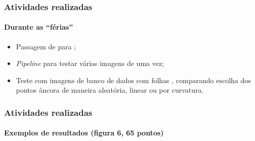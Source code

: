 \begin{frame}
	\frametitle{Atividades realizadas}
	\framesubtitle{Durante as ``férias''}
	
	\begin{itemize}
		\item Passagem de  para ;
		\item \textit{Pipeline} para testar várias imagens de uma vez;
		\item Teste com imagens de banco de dados com folhas \cite{imageclef2011}, comparando escolha dos pontos âncora de maneira aleatória, linear ou por curvatura.
	\end{itemize}
	
\end{frame}


\begin{frame}
	\frametitle{Atividades realizadas}
	\framesubtitle{Exemplos de resultados (figura 6, 65 pontos)}
	

\end{frame}
